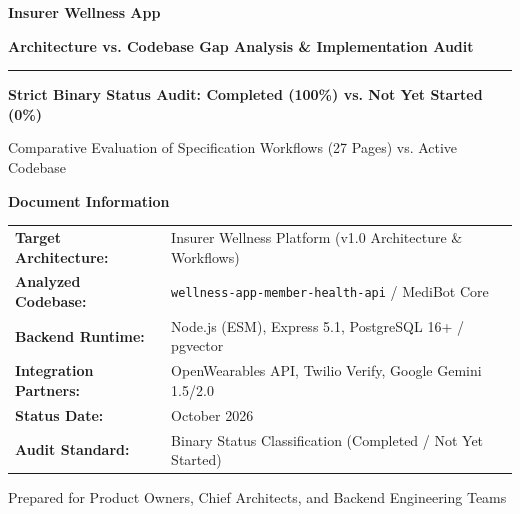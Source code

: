 \documentclass[11pt,a4paper]{article}
\begin{document}
\begin{titlepage}
    \centering
    \vspace*{1.5cm}
    {\Huge\bfseries\color{primaryblue} Insurer Wellness App\par}
    \vspace{0.4cm}
    {\LARGE\bfseries\color{accentteal} Architecture vs. Codebase Gap Analysis \& Implementation Audit\par}
    \vspace{1.2cm}
    \rule{\linewidth}{1.2pt}\par
    \vspace{0.8cm}
    {\large\textbf{Strict Binary Status Audit: Completed (100\%) vs. Not Yet Started (0\%)}\par}
    \vspace{0.5cm}
    {\normalsize Comparative Evaluation of Specification Workflows (27 Pages) vs. Active Codebase\par}
    \vspace{2cm}

    \begin{tcolorbox}[colback=lightgrey,colframe=primaryblue,arc=2mm,boxrule=1pt,width=0.9\textwidth]
        \centering
        \textbf{Document Information}\\[0.2cm]
        \begin{tabular}{ll}
            \textbf{Target Architecture:} & Insurer Wellness Platform (v1.0 Architecture \& Workflows) \\
            \textbf{Analyzed Codebase:} & \texttt{wellness-app-member-health-api} / MediBot Core \\
            \textbf{Backend Runtime:} & Node.js (ESM), Express 5.1, PostgreSQL 16+ / pgvector \\
            \textbf{Integration Partners:} & OpenWearables API, Twilio Verify, Google Gemini 1.5/2.0 \\
            \textbf{Status Date:} & October 2026 \\
            \textbf{Audit Standard:} & Binary Status Classification (Completed / Not Yet Started) \\
        \end{tabular}
    \end{tcolorbox}

    \vfill
    {\small Prepared for Product Owners, Chief Architects, and Backend Engineering Teams\par}
    \vspace*{1cm}
\end{titlepage}
\end{document}
